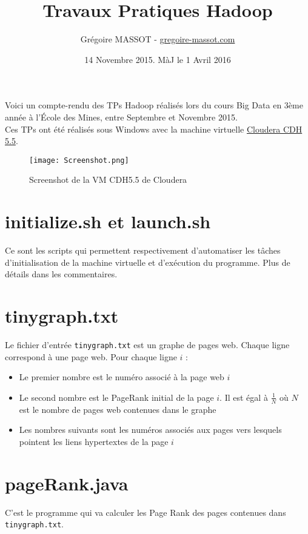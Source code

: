 \documentclass[a4paper,11pt]{article}
\title{Travaux Pratiques Hadoop}
\author{Grégoire MASSOT - \href{http://www.gregoire-massot.com}{gregoire-massot.com}}
\date{14 Novembre 2015. MàJ le 1 Avril 2016}
\begin{document}
\maketitle

Voici un compte-rendu des TPs Hadoop réalisés lors du cours Big Data en 3ème année à l'École des Mines, entre Septembre et Novembre 2015.\\
Ces TPs ont été réalisés sous Windows avec la machine virtuelle \href{http://www.cloudera.com/downloads/quickstart_vms/5-5.html}{Cloudera CDH 5.5}.

\begin{figure}[ht!]
\centering
\texttt{[image: Screenshot.png]}
\caption{Screenshot de la VM CDH5.5 de Cloudera \label{overflow}}
\end{figure}

\section{initialize.sh et launch.sh}

Ce sont les scripts qui permettent respectivement d'automatiser les tâches d'initialisation de la machine virtuelle et d'exécution du programme. Plus de détails dans les commentaires.

\section{tinygraph.txt}

Le fichier d'entrée \texttt{tinygraph.txt} est un graphe de pages web. Chaque ligne correspond à une page web. Pour chaque ligne $i$ :
\begin{itemize}
\item  Le premier nombre est le numéro associé à la page web $i$
\item  Le second nombre est le PageRank initial de la page $i$. Il est égal à $\frac{1}{N}$ où $N$ est le nombre de pages web contenues dans le graphe
\item Les nombres suivants sont les numéros associés aux pages vers lesquels pointent les liens hypertextes de la page $i$
\end{itemize}


\section{pageRank.java}

C'est le programme qui va calculer les Page Rank des pages contenues dans \texttt{tinygraph.txt}.
\end{document}
